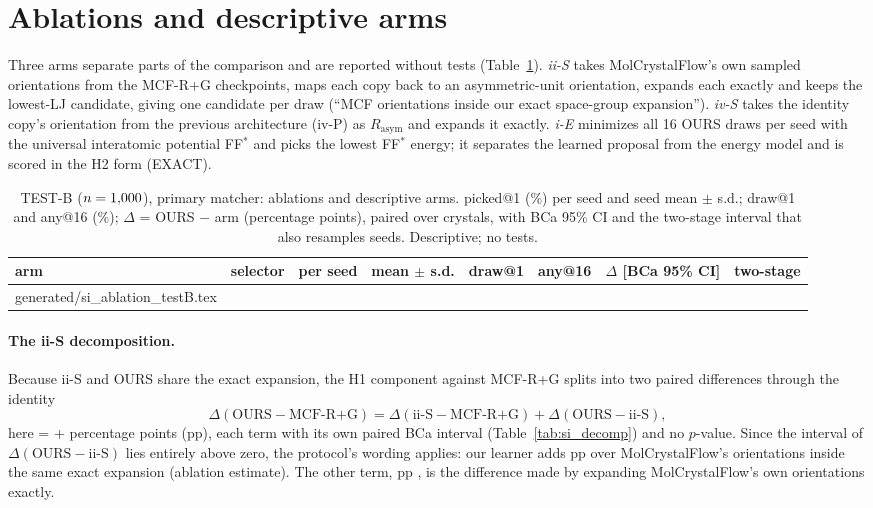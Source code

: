 \documentclass[journal=acsodf,manuscript=article]{achemso}
\makeatletter
\newcommand{\inputrows}[1]{\@@input #1 }
\makeatother
\begin{document}
\clearpage
\section{Ablations and descriptive arms}\label{si:ablations}
Three arms separate parts of the comparison and are reported without tests
(Table~\ref{tab:si_ablation}). \emph{ii-S} takes MolCrystalFlow's own sampled orientations from
the MCF-R+G checkpoints, maps each copy back to an asymmetric-unit orientation, expands each
exactly and keeps the lowest-LJ candidate, giving one candidate per draw (``MCF orientations
inside our exact space-group expansion''). \emph{iv-S} takes the identity copy's orientation from
the previous architecture (iv-P) as $R_{\text{asym}}$ and expands it exactly. \emph{i-E}
minimizes all 16 OURS draws per seed with the universal interatomic potential FF$^\ast$ and picks
the lowest FF$^\ast$ energy; it separates the learned proposal from the energy model and is
scored in the H2 form (EXACT).

\begin{table}[htbp]
\caption{TEST-B ($n=1{,}000$), primary matcher: ablations and descriptive arms. picked@1 (\%) per
seed and seed mean $\pm$ s.d.; draw@1 and any@16 (\%); $\Delta$ = OURS $-$ arm (percentage
points), paired over crystals, with BCa 95\% CI and the two-stage interval that also resamples
seeds. Descriptive; no tests.}
\label{tab:si_ablation}
\centering
\scriptsize
\setlength{\tabcolsep}{3pt}
\begin{tabular}{@{}llcccccc@{}}
\toprule
arm & selector & per seed & mean $\pm$ s.d. & draw@1 & any@16 & $\Delta$ [BCa 95\% CI] & two-stage \\
\midrule
\inputrows{generated/si_ablation_testB.tex}
\bottomrule
\end{tabular}
\end{table}

\paragraph{The ii-S decomposition.} Because ii-S and OURS share the exact expansion, the H1
component against MCF-R+G splits into two paired differences through the identity
\begin{equation}
\Delta(\text{OURS}-\text{MCF-R+G})=\Delta(\text{ii-S}-\text{MCF-R+G})+\Delta(\text{OURS}-\text{ii-S}),
\end{equation}
here \svDecTot{} = \svDecExp{} + \svDecLearn{} percentage points (pp), each term with its own
paired BCa interval (Table~\ref{tab:si_decomp}) and no $p$-value. Since the interval of
$\Delta(\text{OURS}-\text{ii-S})$ lies entirely above zero, the protocol's wording applies: our
learner adds \svDecLearn{} pp \svDecLearnCI{} over MolCrystalFlow's orientations inside the same
exact expansion (ablation estimate). The other term, \svDecExp{} pp \svDecExpCI, is the
difference made by expanding MolCrystalFlow's own orientations exactly.
\end{document}

